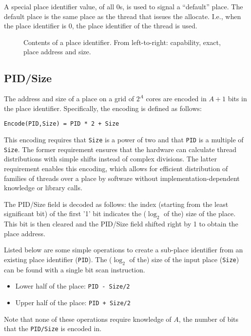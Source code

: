 A special place identifier value, of all 0s, is used to signal a ``default'' place. The default place is the same place as the thread that issues the allocate. I.e., when the place identifier is 0, the place identifier of the thread is used.

\begin{figure}
 \begin{center}
  
  \caption{Contents of a place identifier. From left-to-right: capability, exact, place address and size.}
  \label{fig:place-contents}
 \end{center}
\end{figure}

\subsection{\label{sec:pid-size}PID/Size}
The address and size of a place on a grid of $2^A$ cores are encoded in $A+1$ bits in the place identifier. Specifically, the encoding is defined as follows:
\begin{verbatim}
Encode(PID,Size) = PID * 2 + Size
\end{verbatim}
This encoding requires that {\tt Size} is a power of two and that {\tt PID} is a multiple of {\tt Size}. The former requirement ensures that the hardware can calculate thread distributions with simple shifts instead of complex divisions. The latter requirement enables this encoding, which allows for efficient distribution of families of threads over a place by software without implementation-dependent knowledge or library calls.

The PID/Size field is decoded as follows: the index (starting from the least significant bit) of the first '1' bit indicates the ($\log_2$ of the) size of the place. This bit is then cleared and the PID/Size field shifted right by 1 to obtain the place address.

Listed below are some simple operations to create a sub-place identifier from an existing place identifier ({\tt PID}). The ($\log_2$ of the) size of the input place ({\tt Size}) can be found with a single bit scan instruction.
\begin{itemize}
\item Lower half of the place: {\tt PID - Size/2}
\item Upper half of the place: {\tt PID + Size/2}
\end{itemize}

Note that none of these operations require knowledge of $A$, the number of bits that the {\tt PID/Size} is encoded in.


